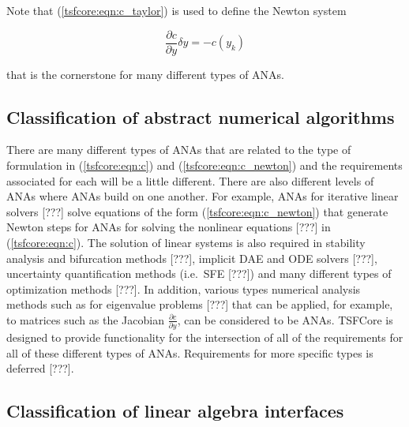 \documentclass[10pt,fleqn]{article}
\begin{document}
Note that (\ref{tsfcore:eqn:c_taylor}) is used to define the 
Newton system

\begin{equation}
\frac{\partial c}{\partial y} \delta y = - c(y_k)
\label{tsfcore:eqn:c_newton}
\end{equation}

that is the cornerstone for many different types of ANAs.

%
\subsection{Classification of abstract numerical algorithms}
\label{tsfcore:sec:classification_of_ANAs}
%

There are many different types of ANAs that are related to the type of
formulation in (\ref{tsfcore:eqn:c}) and (\ref{tsfcore:eqn:c_newton})
and the requirements associated for each will be a little different.
There are also different levels of ANAs where ANAs build on one
another.  For example, ANAs for iterative linear solvers [???] solve
equations of the form (\ref{tsfcore:eqn:c_newton}) that generate
Newton steps for ANAs for solving the nonlinear equations [???] in
(\ref{tsfcore:eqn:c}).  The solution of linear systems is also
required in stability analysis and bifurcation methods [???], implicit
DAE and ODE solvers [???], uncertainty quantification methods
(i.e.~SFE [???]) and many different types of optimization methods
[???].  In addition, various types numerical analysis methods such as
for eigenvalue problems [???] that can be applied, for example, to
matrices such as the Jacobian $\frac{\partial c}{\partial y}$, can be
considered to be ANAs.  TSFCore is designed to provide functionality
for the intersection of all of the requirements for all of these
different types of ANAs.  Requirements for more specific types is
deferred [???].

%
\subsection{Classification of linear algebra interfaces}
\label{tsfcore:sec:classification_of_lin_alg_itfc}
%
\end{document}
